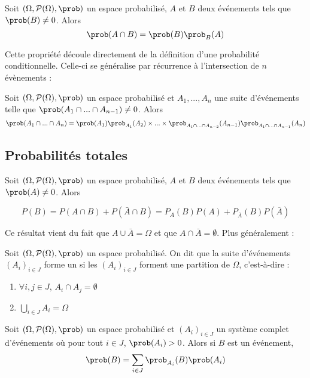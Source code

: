 \begin{proposition}{}{}
	Soit $(\Omega,\mathcal{P}(\Omega),\prob)$ un espace probabilisé, $A$ et $B$ deux événements tels que $\prob(B) \neq 0$. Alors 
	$$\prob(A \cap B) = \prob(B)\prob_B(A)$$
\end{proposition}

Cette propriété découle directement de la définition d'une probabilité conditionnelle. Celle-ci se généralise par récurrence à l'intersection de $n$ évènements :

\begin{proposition}{}{}
	Soit $(\Omega,\mathcal{P}(\Omega),\prob)$ un espace probabilisé et $A_1,...,A_n$ une suite d'événements telle que $\prob(A_1 \cap ... \cap A_{n-1}) \neq 0$. Alors 
	$$\prob(A_1 \cap ... \cap A_n)=\prob(A_1)\prob_{A_1}(A_2) \times ... \times \prob_{A_1 \cap ... \cap A_{n-2}}(A_{n-1})\prob_{A_1 \cap ... \cap A_{n-1}}(A_{n})$$
\end{proposition}


\subsection{Probabilités totales}
\begin{proposition}{}{}
	Soit $(\Omega,\mathcal{P}(\Omega),\prob)$ un espace probabilisé, $A$ et $B$ deux événements tels que $\prob(A) \neq 0$. Alors 
	
	$$P(B) = P(A\cap B) + P(\bar A \cap B) = P_A(B) P(A) + P_{\overline{A}}(B) P(\overline{A}) $$
\end{proposition}

Ce résultat vient du fait que $A \cup \bar A = \Omega$ et que $A \cap \bar A = \emptyset$. Plus généralement :

\begin{definition}{}{}
	Soit $(\Omega,\mathcal{P}(\Omega),\prob)$ un espace probabilisé. On dit que la suite d'événements $(A_i)_{i \in J}$ forme un  si les $(A_i)_{i \in J}$ forment une partition de $\Omega$, c'est-à-dire :  
	\begin{enumerate}
		\item $\forall i,j \in J$, $A_i \cap A_j = \emptyset$
		\item $\bigcup\limits_{i \in J} A_i = \Omega$
	\end{enumerate}
\end{definition}

\begin{theoreme}{}{}
	Soit $(\Omega,\mathcal{P}(\Omega),\prob)$ un espace probabilisé et $(A_i)_{i \in J}$  un système complet d'événements où pour tout $i \in J$, $\prob(A_i) >0$. Alors si $B$ est un événement, 
	$$\prob(B)=\sum_{i \in J} \prob_{A_i}(B) \prob(A_i)$$ 
\end{theoreme}



